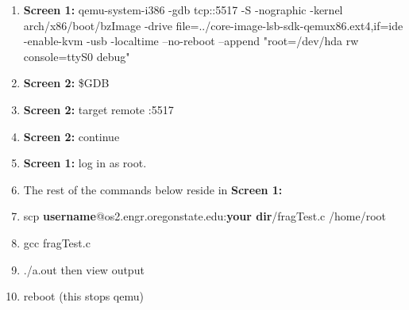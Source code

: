 \documentclass[draftclsnofoot, onecolumn, 10pt, compsoc]{IEEEtran}
\begin{document}
\begin{enumerate}
\begin{enumerate}
					\item{\textbf{Screen 1:} qemu-system-i386 -gdb tcp::5517 -S -nographic -kernel arch/x86/boot/bzImage -drive file=../core-image-lsb-sdk-qemux86.ext4,if=ide -enable-kvm -usb -localtime --no-reboot --append "root=/dev/hda rw console=ttyS0 debug"}
					
					\item \textbf{Screen 2:} \$GDB
					
					\item \textbf{Screen 2:} target remote :5517
					
					\item \textbf{Screen 2:} continue
					
					\item \textbf{Screen 1:} log in as root.
					
					\item The rest of the commands below reside in \textbf{Screen 1:}
					
					\item{scp \textbf{username}@os2.engr.oregonstate.edu:\textbf{your dir}/fragTest.c /home/root}
					
					\item{gcc fragTest.c}
					\item{./a.out then view output}
					
					\item reboot (this stops qemu)
				\end{enumerate}
			\end{enumerate}
\end{document}
